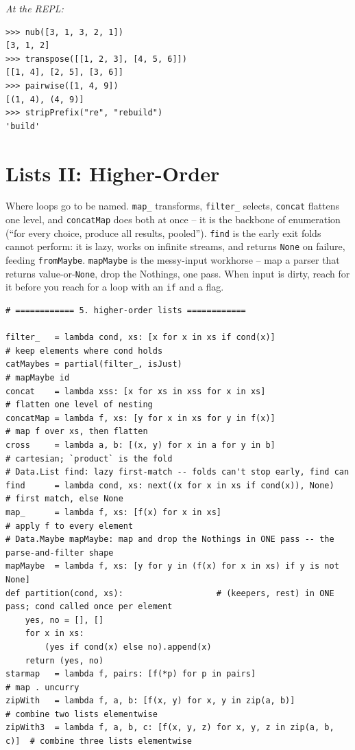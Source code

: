 \documentclass[11pt,letterpaper]{book}
\begin{document}
\noindent\textit{At the REPL:}
\begin{lstlisting}[style=spec]
>>> nub([3, 1, 3, 2, 1])
[3, 1, 2]
>>> transpose([[1, 2, 3], [4, 5, 6]])
[[1, 4], [2, 5], [3, 6]]
>>> pairwise([1, 4, 9])
[(1, 4), (4, 9)]
>>> stripPrefix("re", "rebuild")
'build'
\end{lstlisting}
\chapter{Lists II: Higher-Order}

Where loops go to be named. \texttt{map\_} transforms, \texttt{filter\_}
selects, \texttt{concat} flattens one level, and \texttt{concatMap} does both
at once -- it is the backbone of enumeration (``for every choice, produce all
results, pooled''). \texttt{find} is the early exit folds cannot perform: it is
lazy, works on infinite streams, and returns \texttt{None} on failure, feeding
\texttt{fromMaybe}. \texttt{mapMaybe} is the messy-input workhorse -- map a
parser that returns value-or-\texttt{None}, drop the Nothings, one pass. When
input is dirty, reach for it before you reach for a loop with an \texttt{if}
and a flag.
\begin{lstlisting}[style=code]
# ============ 5. higher-order lists ============

filter_   = lambda cond, xs: [x for x in xs if cond(x)]               # keep elements where cond holds
catMaybes = partial(filter_, isJust)                                  # mapMaybe id
concat    = lambda xss: [x for xs in xss for x in xs]                 # flatten one level of nesting
concatMap = lambda f, xs: [y for x in xs for y in f(x)]               # map f over xs, then flatten
cross     = lambda a, b: [(x, y) for x in a for y in b]               # cartesian; `product` is the fold
# Data.List find: lazy first-match -- folds can't stop early, find can
find      = lambda cond, xs: next((x for x in xs if cond(x)), None)   # first match, else None
map_      = lambda f, xs: [f(x) for x in xs]                          # apply f to every element
# Data.Maybe mapMaybe: map and drop the Nothings in ONE pass -- the parse-and-filter shape
mapMaybe  = lambda f, xs: [y for y in (f(x) for x in xs) if y is not None]
def partition(cond, xs):                   # (keepers, rest) in ONE pass; cond called once per element
    yes, no = [], []
    for x in xs:
        (yes if cond(x) else no).append(x)
    return (yes, no)
starmap   = lambda f, pairs: [f(*p) for p in pairs]                   # map . uncurry
zipWith   = lambda f, a, b: [f(x, y) for x, y in zip(a, b)]           # combine two lists elementwise
zipWith3  = lambda f, a, b, c: [f(x, y, z) for x, y, z in zip(a, b, c)]  # combine three lists elementwise
\end{lstlisting}
\end{document}
